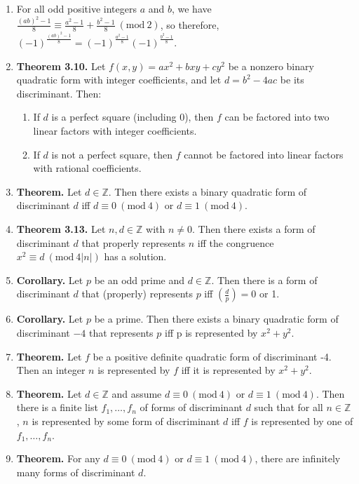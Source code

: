 \documentclass[11pt]{article}
\theoremstyle{definition}
\theoremstyle{named}
\newcommand{\Mod}[1]{\ (\mathrm{mod}\ #1)}
\begin{document}
\begin{enumerate}
    \item For all odd positive integers $a$ and $b$, we have $\frac{(ab)^2 - 1}{8} \equiv \frac{a^2 - 1}{8} + \frac{b^2 - 1}{8} \Mod{2}$, so therefore, $(-1)^{\frac{(ab)^2 - 1}{8}} = (-1)^{\frac{a^2 - 1}{8}}(-1)^{\frac{b^2 - 1}{8}}$. 
    \item \textbf{Theorem 3.10. } Let $f(x,y) = ax^2 + bxy + cy^2$ be a nonzero binary quadratic form with integer coefficients, and let $d = b^2 - 4ac$ be its discriminant. Then: 
    \begin{enumerate}
        \item If $d$ is a perfect square (including $0$), then $f$ can be factored into two linear factors with integer coefficients. 
        \item If $d$ is not a perfect square, then $f$ cannot be factored into linear factors with rational coefficients. 
    \end{enumerate}
    \item \textbf{Theorem. } Let $d \in \mathbb{Z}$. Then there exists a binary quadratic form of discriminant $d$ iff $d \equiv 0 \Mod{4}$ or $d \equiv 1 \Mod{4}$. 
    \item \textbf{Theorem 3.13. } Let $n,d \in \mathbb{Z}$ with $n \neq 0$. Then there exists a form of discriminant $d$ that properly represents $n$ iff the congruence $x^2 \equiv d \Mod{4|n|}$ has a solution. 
    \item \textbf{Corollary. } Let $p$ be an odd prime and $d \in \mathbb{Z}$. Then there is a form of discriminant $d$ that (properly) represents $p$ iff $\left(\frac{d}{p}\right) = 0$ or 1. 
    \item \textbf{Corollary. } Let $p$ be a prime. Then there exists a binary quadratic form of discriminant $-4$ that represents $p$ iff p is represented by $x^2 + y^2$. 
    \item \textbf{Theorem. } Let $f$ be a positive definite quadratic form of discriminant -4. Then an integer $n$ is represented by $f$ iff it is represented by $x^2 + y^2$. 
    \item \textbf{Theorem. } Let $d \in \mathbb{Z}$ and assume $d \equiv 0 \Mod{4}$ or $d \equiv 1 \Mod{4}$. Then there is a finite list $f_1,\dots,f_n$ of forms of discriminant $d$ such that for all $n \in \mathbb{Z}$, $n$ is represented by some form of discriminant $d$ iff $f$ is represented by one of $f_1,\dots,f_n$. 
    \item \textbf{Theorem. } For any $d \equiv 0 \Mod{4}$ or $d \equiv 1 \Mod{4}$, there are infinitely many forms of discriminant $d$. 

\end{enumerate}
\end{document}
